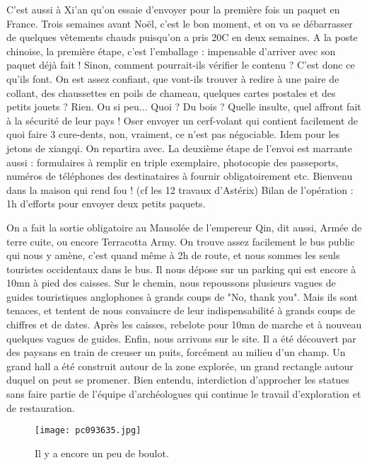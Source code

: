 \documentclass{book}
\begin{document}
C'est aussi à Xi'an qu'on essaie d'envoyer pour la première fois un paquet en France. Trois semaines avant Noël, c'est le bon moment, et on va se débarrasser de quelques vêtements chauds puisqu'on a pris 20\textdegree C en deux semaines. A la poste chinoise, la première étape, c'est l'emballage : impensable d'arriver avec son paquet déjà fait ! Sinon, comment pourrait-ils vérifier le contenu ? C'est donc ce qu'ils font. On est assez confiant, que vont-ils trouver à redire à une paire de collant, des chaussettes en poils de chameau, quelques cartes postales et des petits jouets ? Rien. Ou si peu... Quoi ? Du bois ? Quelle insulte, quel affront fait à la sécurité de leur pays ! Oser envoyer un cerf-volant qui contient facilement de quoi faire 3 cure-dents, non, vraiment, ce n'est pas négociable. Idem pour les jetons de xiangqi. On repartira avec. La deuxième étape de l'envoi est marrante aussi : formulaires à remplir en triple exemplaire, photocopie des passeports, numéros de téléphones des destinataires à fournir obligatoirement etc. Bienvenu dans la maison qui rend fou ! (cf les 12 travaux d'Astérix) Bilan de l'opération : 1h d'efforts pour envoyer deux petits paquets.

On a fait la sortie obligatoire au Mausolée de l'empereur Qin, dit aussi, Armée de terre cuite, ou encore Terracotta Army. On trouve assez facilement le bus public qui nous y amène, c'est quand même à 2h de route, et nous sommes les seuls touristes occidentaux dans le bus. Il nous dépose sur un parking qui est encore à 10mn à pied des caisses. Sur le chemin, nous repoussons plusieurs vagues de guides touristiques anglophones à grands coups de "No, thank you". Mais ils sont tenaces, et tentent de nous convaincre de leur indispensabilité à grands coups de chiffres et de dates. Après les caisses, rebelote pour 10mn de marche et à nouveau quelques vagues de guides. Enfin, nous arrivons sur le site. Il a été découvert par des paysans en train de creuser un puits, forcément au milieu d'un champ. Un grand hall a été construit autour de la zone explorée, un grand rectangle autour duquel on peut se promener. Bien entendu, interdiction d'approcher les statues sans faire partie de l'équipe d'archéologues qui continue le travail d'exploration et de restauration.


\begin{figure}[h]
\centering
\texttt{[image: pc093635.jpg]}
\caption*{Il y a encore un peu de boulot.}
\end{figure}
\end{document}
